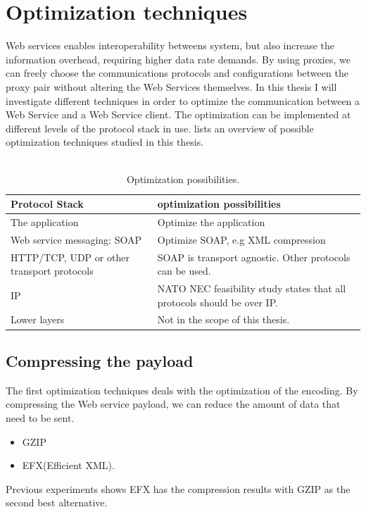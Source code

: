 \documentclass[USenglish]{ifimaster}
\begin{document}
\section{Optimization techniques}
Web services enables interoperability betweens system, but also increase the information overhead, requiring higher data rate demands. By using proxies, we can freely choose the communications protocols and configurations between the proxy pair without altering the Web Services themselves. In this thesis I will investigate different techniques in order to optimize the communication between a Web Service and a Web Service client. The optimization can be implemented at different levels of the protocol stack in use.  lists an overview of possible optimization techniques studied in this thesis.
\\ \\

\begin{table}[h]
\begin{tabularx}{\textwidth}{| X | X |}
\hline
  \textbf{Protocol Stack} & \textbf{optimization possibilities} \\ \hline
  The application & Optimize the application\\ \hline
  Web service messaging: SOAP & Optimize SOAP, e.g XML compression \\ \hline
  HTTP/TCP, UDP or other transport protocols & SOAP is transport agnostic. Other
  protocols can be used. \\ \hline
  IP & NATO NEC feasibility study states that all protocols should be over IP. \\
  \hline
  Lower layers & Not in the scope of this thesis. \\ \hline
\end{tabularx}
\caption{Optimization possibilities.} \label{table:optimalization-overview}
\end{table}


\subsection{Compressing the payload}
The first optimization techniques deals with the optimization of the encoding. By compressing the Web service payload, we can reduce the amount of data that need to be sent.
\begin{itemize}
\item GZIP
\item EFX(Efficient XML).
\end{itemize}
Previous experiments shows EFX has the compression results with GZIP as the second best alternative\cite{johnsen-trude-compression-techniqes}.
\end{document}
